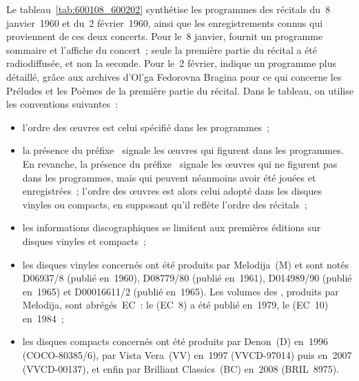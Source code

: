 Le tableau~\ref{tab:600108_600202} synthétise les programmes des récitals
du~8 janvier~1960 et du~2 février~1960, ainsi que les enregistrements connus
qui proviennent de ces deux concerts.
Pour le~8 janvier, \citet[p.~182]{Nekrasova08} fournit un programme sommaire
et \citet{TADGO1960} l'affiche du concert~; seule la première partie du
récital a été radiodiffusée, et non la seconde.
Pour le~2 février, \citet[p.~447]{Milshteyn82a} indique un programme plus
détaillé, grâce aux archives d'\hbox{Ol'ga} Fedorovna Bragina pour ce qui
concerne les Préludes et les Poèmes de la première partie du récital.
Dans le tableau, on utilise les conventions suivantes~:
\begin{itemize}
 \item
 l'ordre des œuvres est celui spécifié dans les programmes~;
 \item
 la présence du préfixe~ signale les œuvres qui figurent dans les
 programmes.
 En revanche, la présence du préfixe~ signale les œuvres qui ne
 figurent pas dans les programmes, mais qui peuvent néanmoins avoir été
 jouées et enregistrées~; l'ordre des œuvres est alors celui adopté dans les
 disques vinyles ou compacts, en supposant qu'il reflète l'ordre des
 récitals~;
 \item
 les informations discographiques se limitent aux premières éditions sur
 disques vinyles et compacts~;
 \item
 les disques vinyles concernés ont été produits par Melodija~(M) et sont
 notés D06937/8 (publié en~1960), D08779/80 (publié en~1961), D014989/90
 (publié en~1965) et D00016611/2 (publié en~1965).
 Les volumes des , produits par Melodija,
 sont abrégés~EC~: le  (EC~8) a été publié en~1979, le 
 (EC~10) en~1984~;
 \item
 les disques compacts concernés ont été produits par Denon~(D) en~1996
 (COCO-80385/6), par Vista Vera~(VV) en~1997 (VVCD-97014) puis en~2007
 (VVCD-00137), et enfin par Brilliant Classics~(BC) en~2008 (BRIL~8975).
\end{itemize}


